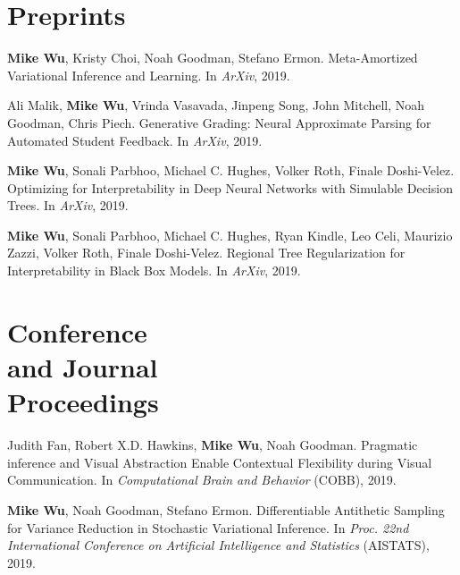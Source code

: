 \documentclass[margin, 10pt]{res} %
\begin{document}
\begin{resume}



\section{Preprints}

\textbf{Mike Wu}, Kristy Choi, Noah Goodman, Stefano Ermon. Meta-Amortized Variational Inference and Learning. In \textit{ArXiv}, 2019.

Ali Malik, \textbf{Mike Wu}, Vrinda Vasavada, Jinpeng Song, John Mitchell, Noah Goodman, Chris Piech. Generative Grading: Neural Approximate Parsing for Automated Student Feedback. In \textit{ArXiv}, 2019.

\textbf{Mike Wu}, Sonali Parbhoo, Michael C. Hughes, Volker Roth, Finale Doshi-Velez. Optimizing for Interpretability in Deep Neural Networks with Simulable Decision Trees. In \textit{ArXiv}, 2019.

\textbf{Mike Wu}, Sonali Parbhoo, Michael C. Hughes, Ryan Kindle, Leo Celi, Maurizio Zazzi, Volker Roth, Finale Doshi-Velez. Regional Tree Regularization for Interpretability in Black Box Models. In \textit{ArXiv}, 2019.

\section{Conference \\and Journal \\Proceedings}

Judith Fan, Robert X.D. Hawkins, \textbf{Mike Wu}, Noah Goodman. Pragmatic inference and Visual Abstraction Enable Contextual Flexibility during Visual Communication. In \textit{Computational Brain and Behavior} (COBB), 2019.

\textbf{Mike Wu}, Noah Goodman, Stefano Ermon. Differentiable Antithetic Sampling for Variance Reduction in Stochastic Variational Inference. In \textit{Proc. 22nd International Conference on Artificial Intelligence and Statistics} (AISTATS), 2019.


\end{resume}
\end{document}
